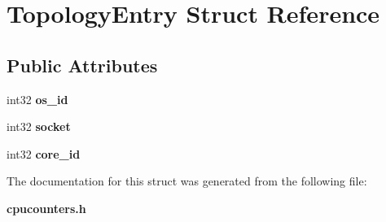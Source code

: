 \section{Topology\+Entry Struct Reference}
\label{structTopologyEntry}
\subsection*{Public Attributes}
\begin{DoxyCompactItemize}
\item 
int32 {\bfseries os\+\_\+id}\label{structTopologyEntry_aa960a8bbdd754740d781072ae1266eed}

\item 
int32 {\bfseries socket}\label{structTopologyEntry_a9b217468c64b3072b48ad5466742827e}

\item 
int32 {\bfseries core\+\_\+id}\label{structTopologyEntry_aee7bef9e2b54f9617a697a43068a5c27}

\end{DoxyCompactItemize}


The documentation for this struct was generated from the following file\+:\begin{DoxyCompactItemize}
\item 
{\bf cpucounters.\+h}\end{DoxyCompactItemize}
